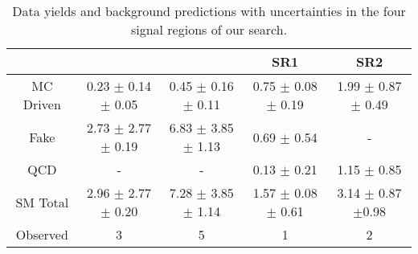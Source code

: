 \begin{table}[!Hhtb]
\begin{center}
\begin{tabular}{c|c|c|c|c}
\hline
\hline
		& \eTau & \muTau & \tauTau SR1 & \tauTau SR2 \\
\hline
MC Driven & 0.23 $\pm$ 0.14 $\pm$ 0.05 & 0.45 $\pm$ 0.16  $\pm$ 0.11  &  0.75 $\pm$ 0.08 $\pm$ 0.19 & 1.99 $\pm$ 0.87 $\pm$ 0.49  \\
Fake      & 2.73 $\pm$ 2.77 $\pm$ 0.19 & 6.83 $\pm$ 3.85  $\pm$ 1.13  &     0.69 $\pm$ 0.54         &           -                 \\
QCD       &             -              &            -                 &     0.13 $\pm$ 0.21         &         1.15 $\pm$ 0.85     \\
\hline
SM Total  & 2.96 $\pm$ 2.77 $\pm$ 0.20 & 7.28 $\pm$ 3.85  $\pm$ 1.14  & 1.57 $\pm$ 0.08 $\pm$ 0.61  & 3.14  $\pm$ 0.87 $\pm$0.98  \\
\hline
\hline
Observed  &               3            &                5             &             1               & 2     \\  
\hline
\hline
\end{tabular}
\caption{Data yields and background predictions with uncertainties in the four signal regions of our search. 
}
\label{tbl:yieldSysSummary}
\end{center}
\end{table}

